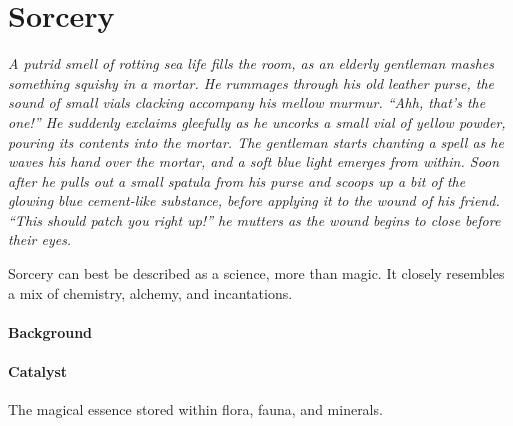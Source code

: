 \section{Sorcery}
\textit{A putrid smell of rotting sea life fills the room, as an elderly gentleman mashes something squishy in a mortar.
He rummages through his old leather purse, the sound of small vials clacking accompany his mellow murmur.
``Ahh, that's the one!'' He suddenly exclaims gleefully as he uncorks a small vial of yellow powder, pouring its contents into the mortar.
The gentleman starts chanting a spell as he waves his hand over the mortar, and a soft blue light emerges from within.
Soon after he pulls out a small spatula from his purse and scoops up a bit of the glowing blue cement-like substance, before applying it to the wound of his friend.
``This should patch you right up!'' he mutters as the wound begins to close before their eyes.}

Sorcery can best be described as a science, more than magic.
It closely resembles a mix of chemistry, alchemy, and incantations.
\paragraph{Background}

\paragraph{Catalyst} The magical essence stored within flora, fauna, and minerals.
